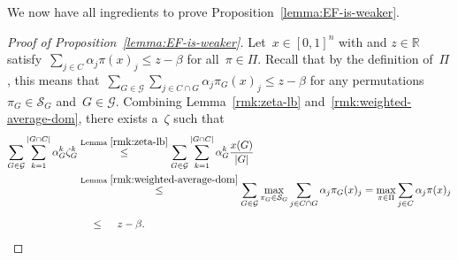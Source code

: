 \documentclass[a4paper,10pt]{article}
\newcommand{\R}{\mathds{R}}
\newcommand{\sym}[1]{\mathcal{S}_{#1}}
\theoremstyle{definition}
\begin{document}
We now have all ingredients to prove Proposition~\ref{lemma:EF-is-weaker}.
\begin{proof}[Proof of Proposition~\ref{lemma:EF-is-weaker}]
  Let~$x\in [0,1]^n$ with and $z \in \R$ satisfy~$\sum_{j\in C} \alpha_j \pi(x)_j \leq z - \beta$ for all~$\pi\in\Pi$.
  Recall that by the definition of~$\Pi$, this means that~$\sum_{G\in \mathcal{G}} \sum_{j\in C\cap G} \alpha_j \pi_G(x)_j \leq z - \beta$ for any permutations~$\pi_G\in\sym{G}$ and~$G\in\mathcal{G}$.
  Combining Lemma~\ref{rmk:zeta-lb} and~\ref{rmk:weighted-average-dom}, there exists a~$\zeta$ such that
  \begin{align*}
    \sum_{G\in\mathcal{G}} \sum_{k=1}^{|G\cap C|} \alpha^k_G \zeta^k_G 
    &\overset{\text{Lemma }\ref{rmk:zeta-lb}}{\leq} \sum_{G\in\mathcal{G}} \sum_{k=1}^{|G\cap C|} \alpha^k_G \frac{x(G)}{|G|} \\
    &\overset{\text{Lemma }\ref{rmk:weighted-average-dom}}{\leq} \sum_{G\in\mathcal{G}} \max_{\pi_G\in\sym{G}} \sum_{j\in C\cap G} \alpha_j \pi_G(x)_j 
    = \max_{\pi\in\Pi} \sum_{j\in C} \alpha_j \pi(x)_j \\
    &\overset{\phantom{\text{Lemma x}}}{\leq} z - \beta.
  \end{align*}
\end{proof}
\end{document}
